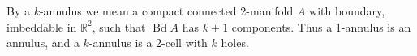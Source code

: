By a $k$-annulus we mean a compact connected 2-manifold $A$ with boundary, imbeddable in $\mathbb{R}^2$, such that $\operatorname{Bd} A$ has $k + 1$ components. Thus a 1-annulus is an annulus, and a $k$-annulus is a 2-cell with $k$ holes.
